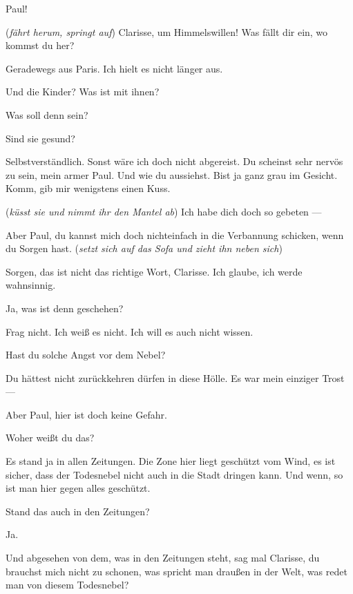 \documentclass[
	final,
	a4paper,
	ngerman,
	mpinclude = true, %
	twoside = true,
	open = right,
	cleardoublepage = plain,
	DIV = 13,
	BCOR = 1cm,
	titlepage = firstiscover,
	]{scrbook}
\newcommand{\direction}[1]{(\textit{#1})}
\newcommand{\thecharacter}[1]{\textup{\textsc{#1}}\xspace}
\newcommand{\theClarisse}{\thecharacter{Clarisse}}
\newcommand{\character}[1]{\item[#1]}
\newcommand{\Generaldirektor}{\character{Direktor}}
\newcommand{\Clarisse}{\character{\theClarisse}}
\begin{document}
\begin{play}

\Clarisse
Paul!

\Generaldirektor
\direction{fährt herum, springt auf} Clarisse, um Himmelswillen! Was fällt dir ein, wo kommst du her?

\Clarisse
Geradewegs aus Paris. Ich hielt es nicht länger aus.

\Generaldirektor
Und die Kinder? Was ist mit ihnen?

\Clarisse
Was soll denn sein?

\Generaldirektor
Sind sie gesund?

\Clarisse
Selbstverständlich. Sonst wäre ich doch nicht abgereist. Du scheinst sehr nervös zu sein, mein armer Paul. Und wie du aussiehst. Bist ja ganz grau im Gesicht. Komm, gib mir wenigstens einen Kuss.

\Generaldirektor
\direction{küsst sie und nimmt ihr den Mantel ab} Ich habe dich doch so gebeten ---

\Clarisse
Aber Paul, du kannst mich doch nichteinfach in die Verbannung schicken, wenn du Sorgen hast. \direction{setzt sich auf das Sofa und zieht ihn neben sich}

\Generaldirektor
Sorgen, das ist nicht das richtige Wort, Clarisse. Ich glaube, ich werde wahnsinnig.

\Clarisse
Ja, was ist denn geschehen?

\Generaldirektor
Frag nicht. Ich weiß es nicht. Ich will es auch nicht wissen.

\Clarisse
Hast du solche Angst vor dem Nebel?

\Generaldirektor
Du hättest nicht zurückkehren dürfen in diese Hölle. Es war mein einziger Trost ---

\Clarisse
Aber Paul, hier ist doch keine Gefahr.

\Generaldirektor
Woher weißt du das?

\Clarisse
Es stand ja in allen Zeitungen. Die Zone hier liegt geschützt vom Wind, es ist sicher, dass der Todesnebel nicht auch in die Stadt dringen kann. Und wenn, so ist man hier gegen alles geschützt.

\Generaldirektor
Stand das auch in den Zeitungen?

\Clarisse
Ja.

\Generaldirektor
Und abgesehen von dem, was in den Zeitungen steht, sag mal Clarisse, du brauchst mich nicht zu schonen, was spricht man draußen in der Welt, was redet man von diesem Todesnebel?


\end{play}
\end{document}
